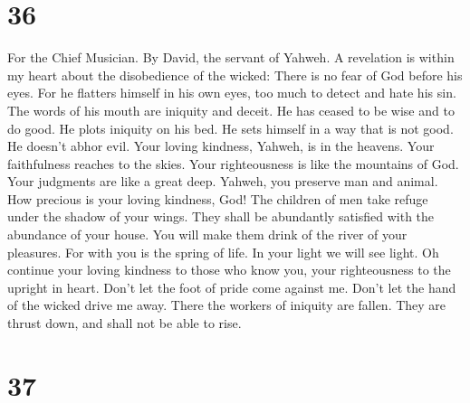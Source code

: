 \hypertarget{section-35}{%
\section{36}\label{section-35}}

For the Chief Musician. By David, the servant of Yahweh. 
A revelation is within my heart about the disobedience of the wicked:
There is no fear of God before his eyes.  For he flatters
himself in his own eyes, too much to detect and hate his sin.
 The words of his mouth are iniquity and deceit. He has
ceased to be wise and to do good.  He plots iniquity on
his bed. He sets himself in a way that is not good. He doesn't abhor
evil.  Your loving kindness, Yahweh, is in the heavens.
Your faithfulness reaches to the skies.  Your
righteousness is like the mountains of God. Your judgments are like a
great deep. Yahweh, you preserve man and animal.  How
precious is your loving kindness, God! The children of men take refuge
under the shadow of your wings.  They shall be abundantly
satisfied with the abundance of your house. You will make them drink of
the river of your pleasures.  For with you is the spring
of life. In your light we will see light.  Oh continue
your loving kindness to those who know you, your righteousness to the
upright in heart.  Don't let the foot of pride come
against me. Don't let the hand of the wicked drive me away.
 There the workers of iniquity are fallen. They are
thrust down, and shall not be able to rise.

\hypertarget{section-36}{%
\section{37}\label{section-36}}

